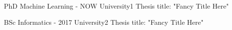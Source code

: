 \cvmetaevent
{}
{PhD Machine Learning\hfill{} - NOW}
{University1}
{Thesis title: "Fancy Title Here"}

\cvmetaevent
{}
{BSc Informatics\hfill{} - 2017}
{University2}
{Thesis title: "Fancy Title Here"}